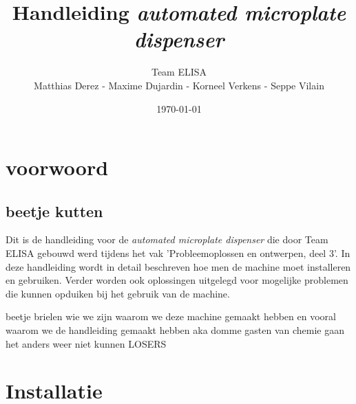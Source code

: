 \documentclass[A4]{kulakreport}
\title{Handleiding \textit{automated microplate dispenser}}
\author{Team ELISA\\
Matthias Derez - Maxime Dujardin - Korneel Verkens - Seppe Vilain}
\date{\today}
\begin{document}
	\maketitle
	\tableofcontents
	\newpage
\chapter{voorwoord}
\section{beetje kutten}

Dit is de handleiding voor de \textit{automated microplate dispenser} die door Team ELISA gebouwd werd tijdens het vak 'Probleemoplossen en ontwerpen, deel 3'. In deze handleiding wordt in detail beschreven hoe men de machine moet installeren en gebruiken. Verder worden ook oplossingen uitgelegd voor mogelijke problemen die kunnen opduiken bij het gebruik van de machine.

beetje brielen wie we zijn waarom we deze machine gemaakt hebben en vooral waarom we de handleiding gemaakt hebben aka domme gasten van chemie gaan het anders weer niet kunnen 
LOSERS

\chapter{Installatie}
\end{document}
